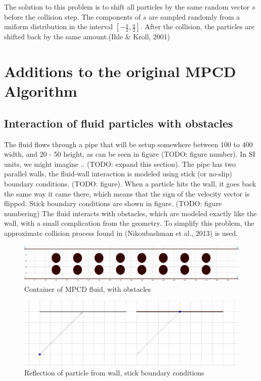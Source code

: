 \documentclass[
]{article}
\begin{document}
The solution to this problem is to shift all particles by the same
random vector \(s\) before the collision step. The components of \(s\)
are sampled randomly from a uniform distribution in the interval
\([-\frac{a}{2}, \frac{a}{2}]\). After the collision, the particles are
shifted back by the same amount.(Ihle \& Kroll, 2001)

\hypertarget{additions-to-the-original-mpcd-algorithm}{%
\section{Additions to the original MPCD
Algorithm}\label{additions-to-the-original-mpcd-algorithm}}

\hypertarget{interaction-of-fluid-particles-with-obstacles}{%
\subsection{Interaction of fluid particles with
obstacles}\label{interaction-of-fluid-particles-with-obstacles}}

The fluid flows through a pipe that will be setup somewhere between 100
to 400 width, and 20 - 50 height, as can be seen in figure (TODO: figure
number). In SI units, we might imagine .. (TODO: expand this section).
The pipe has two parallel walls, the fluid-wall interaction is modeled
using stick (or no-slip) boundary conditions. (TODO: figure). When a
particle hits the wall, it goes back the same way it came there, which
means that the sign of the velocity vector is flipped. Stick boundary
conditions are shown in figure. (TODO: figure numbering) The fluid
interacts with obstacles, which are modeled exactly like the wall, with
a small complication from the geometry. To simplify this problem, the
approximate collision process found in (Nikoubashman et al., 2013) is
used.

\begin{figure}
\centering
\includegraphics{Assets/MPCD_Pipe.png}
\caption{Container of MPCD fluid, with obstacles}
\end{figure}

\begin{figure}
\centering
\includegraphics{Assets/Wall_stick_boundary_conditions_reflection.png}
\caption{Reflection of particle from wall, stick boundary conditions}
\end{figure}
\end{document}
